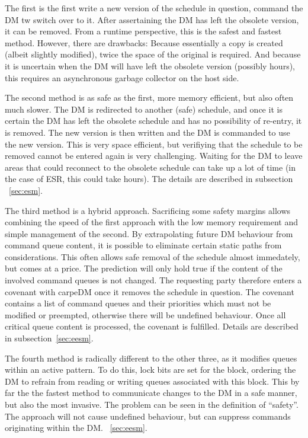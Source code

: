 \begin{itemize}
   \begin{item}
    The first is the first write a new version of the schedule in question, command the DM tw switch over to it. After assertaining the DM has left the obsolete version, it can be removed. From a runtime perspective, this is the safest and fastest method. However, there are drawbacks: Because essentially a copy is created (albeit slightly modified), twice the space of the original is required. And because it is uncertain when the DM will have left the obsolete version (possibly hours), this requires an asynchronous garbage collector on the host side.
  \end{item}
  \begin{item}
    The second method is as safe as the first, more memory efficient, but also often much slower. The DM is redirected to another (safe) schedule, and once it is certain the DM has left the obsolete schedule and has no possibility of re-entry, it is removed. The new version is then written and the DM is commanded to use the new version. This is very space efficient, but verifiying that the schedule to be removed cannot be entered again is very challenging. Waiting for the DM to leave areas that could reconnect to the obsolete schedule can take up a lot of time (in the case of ESR, this could take hours). The details are described in subsection
    ~\ref{sec:esm}.
  \end{item}
  \begin{item}
    The third method is a hybrid approach. Sacrificing some safety margins allows combining the speed of the first approach with the low memory requirement and simple management of the second.
    By extrapolating future DM behaviour from command queue content, it is possible to eliminate certain static paths from considerations. This often allows safe removal of the schedule almost immedately,
    but comes at a price. The prediction will only hold true if the content of the involved command queues is not changed. The requesting party therefore enters a covenant with carpeDM once it removes the schedule in question. The covenant contains a list of command queues and their priorities which must not be modified or preempted, otherwise there will be undefined behaviour. Once all critical queue content is processed, the covenant is fulfilled. Details are described in subsection~\ref{sec:eesm}.
  \end{item}
  \begin{item}
    The fourth method is radically different to the other three, as it modifies queues within an active pattern. To do this, lock bits are set for the block, ordering the DM to refrain from reading or writing queues associated with this block.
    This by far the the fastest method to communicate changes to the DM in a safe manner, but also the most invasive. The problem can be seen in the definition of \enquote{safety}. The approach will not cause undefined behaviour, but can suppress commands originating within the DM. ~\ref{sec:eesm}.
  \end{item}


\end{itemize}

